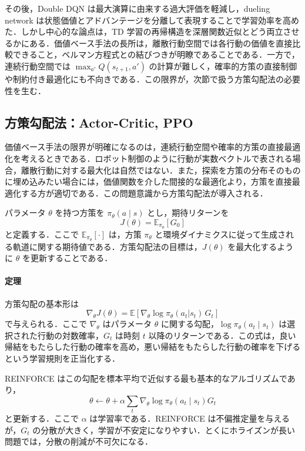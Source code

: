 その後，Double DQN は最大演算に由来する過大評価を軽減し，dueling network は状態価値とアドバンテージを分離して表現することで学習効率を高めた．しかし中心的な論点は，TD 学習の再帰構造を深層関数近似とどう両立させるかにある．価値ベース手法の長所は，離散行動空間では各行動の価値を直接比較できること，ベルマン方程式との結びつきが明瞭であることである．一方で，連続行動空間では $\max_{a'} Q(s_{t+1},a')$ の計算が難しく，確率的方策の直接制御や制約付き最適化にも不向きである．この限界が，次節で扱う方策勾配法の必要性を生む．

\subsection{方策勾配法：Actor-Critic, PPO}

価値ベース手法の限界が明確になるのは，連続行動空間や確率的方策の直接最適化を考えるときである．ロボット制御のように行動が実数ベクトルで表される場合，離散行動に対する最大化は自然ではない．また，探索を方策の分布そのものに埋め込みたい場合には，価値関数を介した間接的な最適化より，方策を直接最適化する方が適切である．この問題意識から方策勾配法が導入される．

パラメータ $\theta$ を持つ方策を $\pi_\theta(a \mid s)$ とし，期待リターンを
\begin{equation*}
J(\theta) = \mathbb{E}_{\pi_\theta}[G_0]
\end{equation*}
と定義する．ここで $\mathbb{E}_{\pi_\theta}[\cdot]$ は，方策 $\pi_\theta$ と環境ダイナミクスに従って生成される軌道に関する期待値である．方策勾配法の目標は，$J(\theta)$ を最大化するように $\theta$ を更新することである．

\paragraph*{定理}
方策勾配の基本形は
\begin{equation*}
\nabla_\theta J(\theta) = \mathbb{E}\left[\nabla_\theta \log \pi_\theta(a_t|s_t)\, G_t\right]
\end{equation*}
で与えられる\cite{Williams1992}．ここで $\nabla_\theta$ はパラメータ $\theta$ に関する勾配，$\log \pi_\theta(a_t \mid s_t)$ は選択された行動の対数確率，$G_t$ は時刻 $t$ 以降のリターンである．この式は，良い帰結をもたらした行動の確率を高め，悪い帰結をもたらした行動の確率を下げるという学習規則を正当化する．

REINFORCE はこの勾配を標本平均で近似する最も基本的なアルゴリズムであり，
\begin{equation*}
\theta \leftarrow \theta + \alpha \sum_t \nabla_\theta \log \pi_\theta(a_t \mid s_t) G_t
\end{equation*}
と更新する．ここで $\alpha$ は学習率である．REINFORCE は不偏推定量を与えるが，$G_t$ の分散が大きく，学習が不安定になりやすい．とくにホライズンが長い問題では，分散の削減が不可欠になる．


